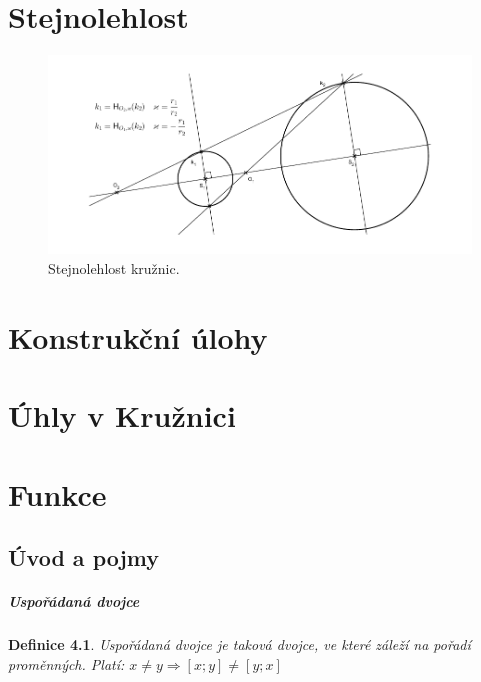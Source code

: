 \documentclass[12pt,a4wide,oneside,
headings]{report}
\newtheorem{defi}{Definice}[chapter]\theoremstyle{definition}
\begin{document}
\chapter{Stejnolehlost}
\begin{figure}
\includegraphics[width=1\textwidth]{souhrn/stejnolehlost_kruznic}
\caption{Stejnolehlost kružnic.}
\end{figure}

\chapter{Konstrukční úlohy}
\chapter{Úhly v Kružnici}

\chapter{Funkce}
\section{Úvod a pojmy}

\paragraph{Uspořádaná dvojce}
\begin{defi}%
Uspořádaná dvojce je taková dvojce, ve které záleží na pořadí proměnných.
Platí: $ x\neq y \Rightarrow \left[ x;y \right] \neq \left[ y;x \right]$
\end{defi}
\end{document}
